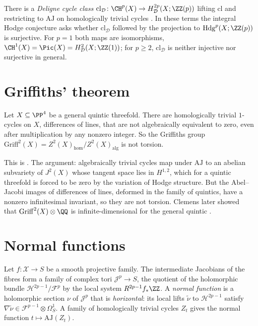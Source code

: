 \begin{remark}\label{vhs:remark-deligne-cycle-class}
There is a \emph{Deligne cycle class} $\mathrm{cl}_{\mathcal{D}} \colon \CH^p(X) \to H^{2p}_{\mathcal{D}}(X; \ZZ(p))$ lifting $\mathrm{cl}$ and restricting to $\mathrm{AJ}$ on homologically trivial cycles
\cite[Chapter 12]{voisin-hodge-1}. In these terms the integral Hodge conjecture asks whether $\mathrm{cl}_{\mathcal{D}}$ followed by the projection to $\mathrm{Hdg}^p(X; \ZZ(p))$ is surjective. For
$p = 1$ both maps are isomorphisms, $\CH^1(X) = \Pic(X) = H^2_{\mathcal{D}}(X; \ZZ(1))$; for $p \geq 2$, $\mathrm{cl}_{\mathcal{D}}$ is neither injective nor surjective in general.
\end{remark}

\section{Griffiths' theorem}\label{vhs:section-griffiths}

\begin{theorem}[Griffiths]\label{vhs:theorem-griffiths}
Let $X \subseteq \PP^4$ be a general quintic threefold. There are homologically trivial $1$-cycles on $X$, differences of lines, that are not algebraically equivalent to zero, even after multiplication
by any nonzero integer. So the Griffiths group $\mathrm{Griff}^2(X) = Z^2(X)_{\mathrm{hom}}/Z^2(X)_{\mathrm{alg}}$ is not torsion.
\end{theorem}

This is \cite{griffiths-1969}. The argument: algebraically trivial cycles map under $\mathrm{AJ}$ to an abelian subvariety of $J^2(X)$ whose tangent space lies in $H^{1,2}$, which for a quintic
threefold is forced to be zero by the variation of Hodge structure. But the Abel--Jacobi images of differences of lines, deformed in the family of quintics, have a nonzero infinitesimal
invariant, so they are not torsion. Clemens later showed that $\mathrm{Griff}^2(X) \otimes \QQ$ is infinite-dimensional for the general quintic \cite{clemens-1983}.

\section{Normal functions}\label{vhs:section-normal-functions}

\begin{definition}\label{vhs:definition-normal-function}
Let $f \colon \mathcal{X} \to S$ be a smooth projective family. The intermediate Jacobians of the fibres form a family of complex tori $\mathcal{J}^p \to S$, the quotient of the holomorphic bundle
$\mathcal{H}^{2p-1}/\mathcal{F}^p$ by the local system $R^{2p-1}f_*\ZZ$. A \emph{normal function} is a holomorphic section $\nu$ of $\mathcal{J}^p$ that is \emph{horizontal}: its local lifts $\tilde\nu$ to
$\mathcal{H}^{2p-1}$ satisfy $\nabla\tilde\nu \in \mathcal{F}^{p-1} \otimes \Omega^1_S$. A family of homologically trivial cycles $Z_t$ gives the normal function $t \mapsto \mathrm{AJ}(Z_t)$.
\end{definition}


